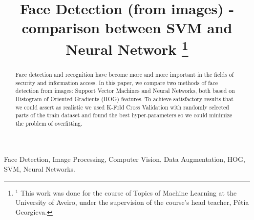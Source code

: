\documentclass[conference]{IEEEtran}
\begin{document}
\title{Face Detection (from images) - comparison between SVM and Neural Network
\thanks{$^{1}$ This work was done for the course of Topics of Machine Learning at the University of Aveiro, under the supervision of the course's head teacher, Pétia Georgieva.}%
}

\author{
\and
{}
}

\maketitle

\begin{abstract}
Face detection and recognition have become more and more important in the fields of security and information access. In this paper, we compare two methods of face detection from images: Support Vector Machines and Neural Networks, both based on Histogram of Oriented Gradients (HOG) features. To achieve satisfactory results that we could assert as realistic we used K-Fold Cross Validation with randomly selected parts of the train dataset and found the best hyper-parameters so we could minimize the problem of overfitting.
\end{abstract}

\begin{IEEEkeywords}
Face Detection, Image Processing, Computer Vision, Data Augmentation, HOG, SVM, Neural Networks.
\end{IEEEkeywords}





















\end{document}
